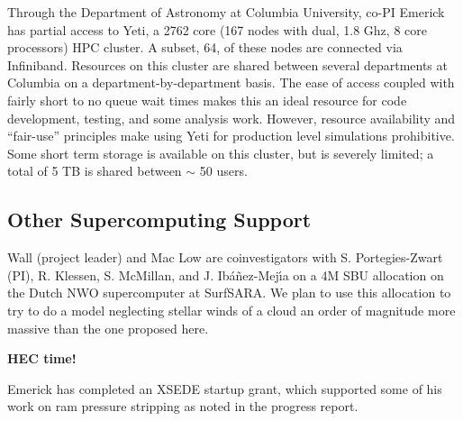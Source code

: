 \documentclass[11pt]{article}
\begin{document}
Through the Department of Astronomy at Columbia University, co-PI Emerick has partial access to Yeti, a 2762 core (167 nodes with dual, 1.8 Ghz, 8 core processors) HPC cluster. A subset, 64, of these nodes are connected via Infiniband. Resources on this cluster are shared between several departments at Columbia on a department-by-department basis. The ease of access coupled with fairly short to no queue wait times makes this an ideal resource for code development, testing, and some analysis work. However, resource availability and ``fair-use'' principles make using Yeti for production level simulations prohibitive. Some short term storage is available on this cluster, but is severely limited; a total of 5 TB is shared between $\sim$ 50 users.

\subsection{Other Supercomputing Support}

Wall (project leader) and Mac Low are coinvestigators with S. Portegies-Zwart (PI), R. Klessen,  S. McMillan, and J. Ib\'a\~nez-Mej\'{\i}a on a 4M SBU allocation on the Dutch NWO supercomputer at SurfSARA.  We plan to use this allocation to try to do a model neglecting stellar winds of a cloud an order of magnitude more massive than the one proposed here.

{\bf HEC time!}

Emerick has completed an XSEDE startup grant, which supported some of his work on ram pressure stripping as noted in the progress report.

\clearpage


\end{document}
